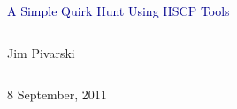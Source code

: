 \documentclass[compress]{beamer}
\begin{document}
\begin{frame}
\vfill
\begin{center}
\textcolor{darkblue}{\Large A Simple Quirk Hunt Using HSCP Tools}

\vfill
\begin{columns}
\begin{center}
\large
Jim Pivarski
\end{center}
\end{columns}


\vfill
 8 September, 2011

\end{center}
\end{frame}


\small
\end{document}
